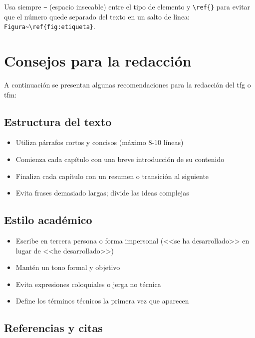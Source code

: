 \begin{tipbox}
  Usa siempre \verb|~| (espacio insecable) entre el tipo de elemento y
  \verb|\ref{}| para evitar que el número quede separado del texto en
  un salto de línea: \verb|Figura~\ref{fig:etiqueta}|.
\end{tipbox}

\section{Consejos para la redacción}
\label{sec:consejos}

A continuación se presentan algunas recomendaciones para la redacción del \gls{tfg} o \gls{tfm}:

\subsection{Estructura del texto}

\begin{itemize}
  \item Utiliza párrafos cortos y concisos (máximo 8-10 líneas)
  \item Comienza cada capítulo con una breve introducción de su contenido
  \item Finaliza cada capítulo con un resumen o transición al siguiente
  \item Evita frases demasiado largas; divide las ideas complejas
\end{itemize}

\subsection{Estilo académico}

\begin{itemize}
  \item Escribe en tercera persona o forma impersonal (<<se ha desarrollado>> en lugar de <<he desarrollado>>)
  \item Mantén un tono formal y objetivo
  \item Evita expresiones coloquiales o jerga no técnica
  \item Define los términos técnicos la primera vez que aparecen
\end{itemize}

\subsection{Referencias y citas}

